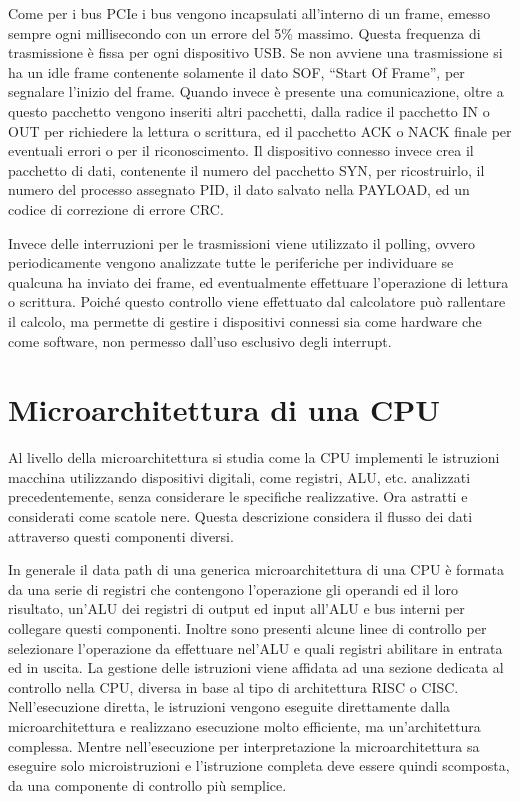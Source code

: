 \documentclass{article}
\numberwithin{equation}{subsection}
\begin{document}
Come per i bus PCIe i bus vengono incapsulati all'interno di un frame, emesso sempre ogni millisecondo con un errore del 5\% massimo. Questa frequenza di trasmissione è fissa per ogni dispositivo 
USB. Se non avviene una trasmissione si ha un idle frame contenente solamente il dato SOF, ``Start Of Frame'', per segnalare l'inizio del frame. Quando invece è presente una comunicazione, 
oltre a questo pacchetto vengono inseriti altri pacchetti, dalla radice il pacchetto IN o OUT per richiedere la lettura o scrittura, ed il pacchetto ACK o NACK finale per eventuali errori 
o per il riconoscimento. Il dispositivo connesso invece crea il pacchetto di dati, contenente il numero del pacchetto SYN, per ricostruirlo, il numero del processo assegnato PID, il dato 
salvato nella PAYLOAD, ed un codice di correzione di errore CRC. 

Invece delle interruzioni per le trasmissioni viene utilizzato il polling, ovvero periodicamente vengono analizzate tutte le periferiche per individuare se qualcuna ha inviato dei frame, 
ed eventualmente effettuare l'operazione di lettura o scrittura. Poiché questo controllo viene effettuato dal calcolatore può rallentare il calcolo, ma permette di gestire i dispositivi 
connessi sia come hardware che come software, non permesso dall'uso esclusivo degli interrupt. 

\clearpage

\section{Microarchitettura di una CPU}

Al livello della microarchitettura si studia come la CPU implementi le istruzioni macchina utilizzando dispositivi digitali, come registri, ALU, etc. analizzati precedentemente, senza 
considerare le specifiche realizzative. Ora astratti e considerati come scatole nere. Questa descrizione considera il flusso dei dati attraverso questi componenti diversi. 

In generale il data path di una generica microarchitettura di una CPU è formata da una serie di registri che contengono l'operazione gli operandi ed il loro risultato, un'ALU dei registri 
di output ed input all'ALU e bus interni per collegare questi componenti. Inoltre sono presenti alcune linee di controllo per selezionare l'operazione da effettuare nel'ALU e quali registri 
abilitare in entrata ed in uscita. 
La gestione delle istruzioni viene affidata ad una sezione dedicata al controllo nella CPU, diversa in base al tipo di architettura RISC o CISC. 
Nell'esecuzione diretta, le istruzioni vengono eseguite direttamente dalla microarchitettura e realizzano esecuzione molto efficiente, ma un'architettura complessa. Mentre nell'esecuzione 
per interpretazione la microarchitettura sa eseguire solo microistruzioni e l'istruzione completa deve essere quindi scomposta, da una componente di controllo più semplice. 
\end{document}
